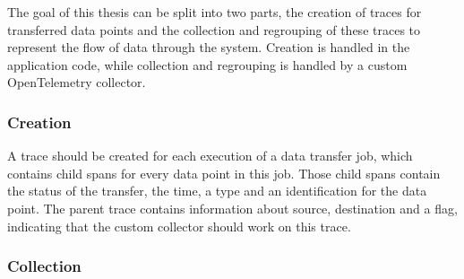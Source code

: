 

The goal of this thesis can be split into two parts, the creation of traces for transferred data points
and the collection and regrouping of these traces to represent the flow of data through the system.
Creation is handled in the application code, while collection and regrouping is handled by a
custom OpenTelemetry collector.

\subsubsection{Creation}

A trace should be created for each execution of a data transfer job,
which contains child spans for every data point in this job.
Those child spans contain the status of the transfer, the time,
a type and an identification for the data point.
The parent trace contains information about source, destination and a flag, indicating that the custom collector should
work on this trace.

\subsubsection{Collection}

